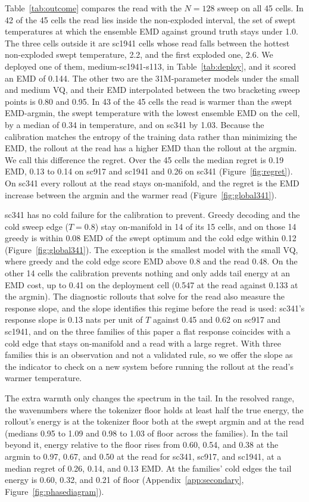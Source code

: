 \documentclass{article}
\begin{document}
Table~\ref{tab:outcome} compares the read with the $N{=}128$ sweep on all 45 cells. In 42 of
the 45 cells the read lies inside the non-exploded interval, the set of swept temperatures at
which the ensemble EMD against ground truth stays under 1.0. The three cells outside it are
sc1941 cells whose read falls between the hottest non-exploded swept temperature, 2.2, and the
first exploded one, 2.6. We deployed one of them, medium-sc1941-s113, in
Table~\ref{tab:deploy}, and it scored an EMD of 0.144. The other two are the 31M-parameter
models under the small and medium VQ, and their EMD interpolated between the two bracketing
sweep points is 0.80 and 0.95. In 43 of the 45 cells the read is warmer than the swept
EMD-argmin, the swept temperature with the lowest ensemble EMD on the cell, by a median of
0.34 in temperature, and on sc341 by 1.03. Because the calibration matches the entropy of the
training data rather than minimizing the EMD, the rollout at the read has a higher EMD than the
rollout at the argmin. We call this difference the regret. Over the 45 cells the median regret
is 0.19 EMD, 0.13 to 0.14 on sc917 and sc1941 and 0.26 on sc341
(Figure~\ref{fig:regret}). On sc341 every rollout at the read stays on-manifold, and the
regret is the EMD increase between the argmin and the warmer read
(Figure~\ref{fig:global341}).

sc341 has no cold failure for the calibration to prevent. Greedy decoding and the cold
sweep edge ($T{=}0.8$) stay on-manifold in 14 of its 15 cells, and on those 14 greedy is
within 0.08 EMD of the swept optimum and the cold edge within 0.12
(Figure~\ref{fig:global341}). The exception is the smallest model with the small VQ, where
greedy and the cold edge score EMD above 0.8 and the read 0.48. On the other 14 cells the
calibration prevents nothing and only adds tail energy at an EMD cost, up to 0.41 on the
deployment cell (0.547 at the read against 0.133 at the argmin). The diagnostic rollouts
that solve for the read also measure the response slope, and the slope identifies this
regime before the read is used: sc341's response slope is 0.13 nats per unit of $T$
against 0.45 and 0.62 on sc917 and sc1941, and on the three families of this paper a flat
response coincides with a cold edge that stays on-manifold and a read with a large regret.
With three families this is an observation and not a validated rule, so we offer the slope
as the indicator to check on a new system before running the rollout at the read's warmer
temperature.

The extra warmth only changes the spectrum in the tail. In the resolved range, the
wavenumbers where the tokenizer floor holds at least half the true energy, the rollout's
energy is at the tokenizer floor both at the swept argmin and at the read (medians 0.95 to 1.09 and 0.98 to 1.03
of floor across the families). In the tail beyond it, energy relative to the floor rises
from 0.60, 0.54, and 0.38 at the argmin to 0.97, 0.67, and 0.50 at the read for sc341,
sc917, and sc1941, at a median regret of 0.26, 0.14, and 0.13 EMD. At the families' cold
edges the tail energy is 0.60, 0.32, and 0.21 of floor (Appendix~\ref{app:secondary},
Figure~\ref{fig:phasediagram}).
\end{document}
